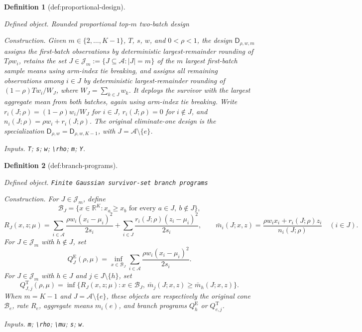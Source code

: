 \documentclass{article}
\newtheorem{definition}{Definition}
\begin{document}
\begin{definition}[def:proportional-design]\label{def:proportional-design}
\par\smallskip\noindent\emph{Defined object.} Rounded proportional top-\(m\) two-batch design
\par\smallskip\noindent\emph{Construction.} Given \(m\in\{2,\ldots,K-1\}\), \(T\), \(s\), \(w\), and \(0<\rho<1\), the design \(\mathsf D_{\rho,w,m}\) assigns the first-batch observations by deterministic largest-remainder rounding of \(T\rho w_i\), retains the set \(J\in\mathcal J_m:=\{J\subseteq\mathcal A:|J|=m\}\) of the \(m\) largest first-batch sample means using arm-index tie breaking, and assigns all remaining observations among \(i\in J\) by deterministic largest-remainder rounding of \((1-\rho)T w_i/W_J\), where \(W_J=\sum_{k\in J}w_k\). It deploys the survivor with the largest aggregate mean from both batches, again using arm-index tie breaking. Write \(r_i(J;\rho)=(1-\rho)w_i/W_J\) for \(i\in J\), \(r_i(J;\rho)=0\) for \(i\notin J\), and \(n_i(J;\rho)=\rho w_i+r_i(J;\rho)\). The original eliminate-one design is the specialization \(\mathsf D_{\rho,w}=\mathsf D_{\rho,w,K-1}\), with \(J=\mathcal A\setminus\{e\}\).
\par\smallskip\noindent\emph{Inputs.} \texttt{T}; \texttt{s}; \texttt{w}; \texttt{\textbackslash{}\allowbreak{}rho}; \texttt{m}; \texttt{Y}.
\end{definition}

\begin{definition}[def:branch-programs]\label{def:branch-programs}
\par\smallskip\noindent\emph{Defined object.} \texttt{Finite Gaussian survivor-\allowbreak{}set branch programs}
\par\smallskip\noindent\emph{Construction.} For \(J\in\mathcal J_m\), define
\[
 \mathcal B_J=\{x\in\mathbb R^K:x_a\ge x_b\text{ for every }a\in J,\ b\notin J\},
\]
\[
 R_J(x,z;\mu)=\sum_{i\in\mathcal A}\frac{\rho w_i(x_i-\mu_i)^2}{2s_i}
 +\sum_{i\in J}\frac{r_i(J;\rho)(z_i-\mu_i)^2}{2s_i},
 \qquad
 \bar m_i(J;x,z)=\frac{\rho w_i x_i+r_i(J;\rho)z_i}{n_i(J;\rho)}\quad(i\in J).
\]
For \(J\in\mathcal J_m\) with \(h\notin J\), set
\[
 Q_J^{\mathrm E}(\rho,\mu)=\inf_{x\in\mathcal B_J}
 \sum_{i\in\mathcal A}\frac{\rho w_i(x_i-\mu_i)^2}{2s_i}.
\]
For \(J\in\mathcal J_m\) with \(h\in J\) and \(j\in J\setminus\{h\}\), set
\[
 Q_{J,j}^{\mathrm T}(\rho,\mu)=
 \inf\{R_J(x,z;\mu):x\in\mathcal B_J,\ \bar m_j(J;x,z)\ge \bar m_h(J;x,z)\}.
\]
When \(m=K-1\) and \(J=\mathcal A\setminus\{e\}\), these objects are respectively the original cone \(\mathcal B_e\), rate \(R_e\), aggregate means \(m_i(e)\), and branch programs \(Q_h^{\mathrm E}\) or \(Q_{e,j}^{\mathrm T}\).
\par\smallskip\noindent\emph{Inputs.} \texttt{m}; \texttt{\textbackslash{}\allowbreak{}rho}; \texttt{\textbackslash{}\allowbreak{}mu}; \texttt{s}; \texttt{w}.
\end{definition}
\end{document}
